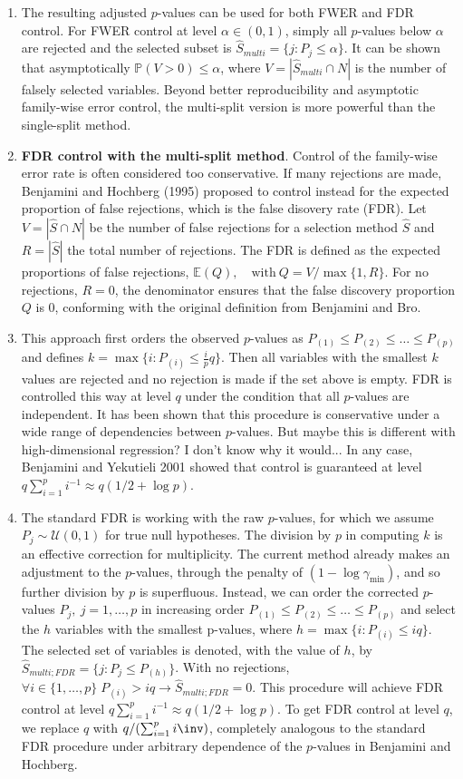 \begin{enumerate}
\begin{enumerate}
        \item The resulting adjusted $p$-values can be used for both FWER and FDR control. For FWER control at level $\alpha\in(0,1)$, simply all $p$-values below $\alpha$ are rejected and the selected subset is $\hat{S}_{multi} = \{j:P_j \leq \alpha\}$. It can be shown that asymptotically $\mathbb{P}(V > 0) \leq \alpha$, where $V = |\hat{S}_{multi} \cap N|$ is the number of falsely selected variables. Beyond better reproducibility and asymptotic family-wise error control, the multi-split version is more powerful than the single-split method. 
        \item \textbf{FDR control with the multi-split method}. Control of the family-wise error rate is often considered too conservative. If many rejections are made, Benjamini and Hochberg (1995) proposed to control instead for the expected proportion of false rejections, which is the false disovery rate (FDR). Let $V = |\hat{S} \cap N|$ be the number of false rejections for a selection method $\hat{S}$ and $R = |\hat{S}|$ the total number of rejections. The FDR is defined as the expected proportions of false rejections, $\mathbb{E}(Q),\quad\text{with}\ Q = V/\max\{1,R\}$. For no rejections, $R = 0$, the denominator ensures that the false discovery proportion $Q$ is $0$, conforming with the original definition from Benjamini and Bro. 
        \item This approach first orders the observed $p$-values as $P_{(1)} \leq P_{(2)} \leq \ldots \leq P_{(p)}$ and defines $k = \max\{i:P_{(i)} \leq \frac{i}{p}q\}$. Then all variables with the smallest $k$ values are rejected and no rejection is made if the set above is empty. FDR is controlled this way at level $q$ under the condition that all $p$-values are independent. It has been shown that this procedure is conservative under a wide range of dependencies between $p$-values. But maybe this is different with high-dimensional regression? I don't know why it would... In any case, Benjamini and Yekutieli 2001 showed that control is guaranteed at level $q\sum_{i=1}^p i^{-1} \approx q(1/2 + \log p)$. 
        \item The standard FDR is working with the raw $p$-values, for which we assume $P_j \sim \mathcal{U}(0,1)$ for true null hypotheses. The division by $p$ in computing $k$ is an effective correction for multiplicity. The current method already makes an adjustment to the $p$-values, through the penalty of $(1 - \log\gamma_{\min})$, and so further division by $p$ is superfluous. Instead, we can order the corrected $p$-values $P_j,\ j = 1,\ldots,p$ in increasing order $P_{(1)} \leq P_{(2)} \leq \ldots \leq P_{(p)}$ and select the $h$ variables with the smallest p-values, where $h = \max\{i:P_{(i)} \leq iq\}$. The selected set of variables is denoted, with the value of $h$, by $\hat{S}_{multi;FDR} = \{j:P_j \leq P_{(h)}\}$. With no rejections, $\forall i \in \{1,\ldots,p\}\; P_{(i)} > iq \rightarrow \hat{S}_{multi;FDR} = 0$. This procedure will achieve FDR control at level $q\sum_{i=1}^p i^{-1} \approx q(1/2 + \log p)$. To get FDR control at level $q$, we replace $q$ with $q/(\sum_{i=1}^p i\inv)$, completely analogous to the standard FDR procedure under arbitrary dependence of the $p$-values in Benjamini and Hochberg. 

\end{enumerate}
\end{enumerate}
